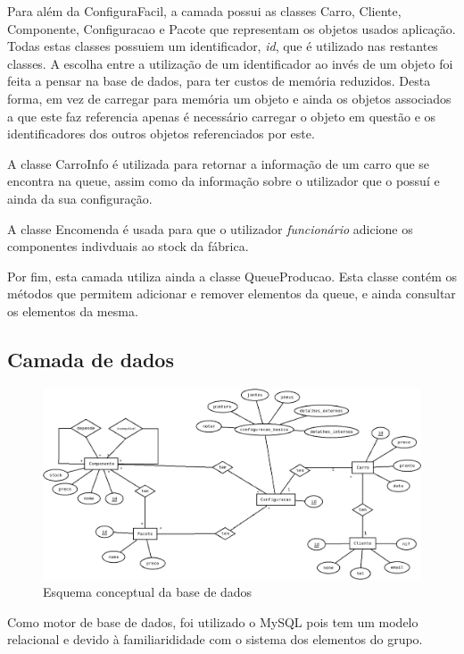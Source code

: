 \documentclass{llncs}
\begin{document}
Para além da ConfiguraFacil, a camada possui as classes Carro, Cliente, Componente, Configuracao e Pacote que representam os objetos usados aplicação. Todas estas classes possuiem um identificador, \textit{id}, que é utilizado nas restantes classes. A escolha entre a utilização de um identificador ao invés de um objeto foi feita a pensar na base de dados, para ter custos de memória reduzidos. Desta forma, em vez de carregar para memória um objeto e ainda os objetos associados a que este faz referencia apenas é necessário carregar o objeto em questão e os identificadores dos outros objetos referenciados por este. 

A classe CarroInfo é utilizada para retornar a informação de um carro que se encontra na queue, assim como da informação sobre o utilizador que o possuí e ainda da sua configuração.

A classe Encomenda é usada para que o utilizador \textit{funcionário} adicione os componentes indivduais ao stock da fábrica.

Por fim, esta camada utiliza ainda a classe QueueProducao. Esta classe contém os métodos que permitem adicionar e remover elementos da queue, e ainda consultar os elementos da mesma.

\subsection{Camada de dados}

\begin{figure}
\begin{center}
\includegraphics[scale=0.33]{esquema_conceptual.png}
\end{center}
\caption{\label{fig:esquema_conceptual}Esquema conceptual da base de dados}
\end{figure}

Como motor de base de dados, foi utilizado o MySQL pois tem um modelo relacional e devido à familiarididade com o sistema dos elementos do grupo.
\end{document}
